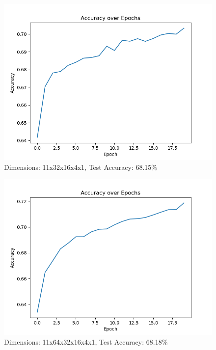 \documentclass[12pt, notitlepage]{article}
\begin{document}
\begin{figure}[H]
	\centering
	\includegraphics[scale=0.6]{neuralnet1.png}
	\caption{Dimensions: 11x32x16x4x1, Test Accuracy: 68.15\%}
\end{figure}
\begin{figure}[H]
	\centering
	\includegraphics[scale=0.6]{neuralnet2.png}
	\caption{Dimensions: 11x64x32x16x4x1, Test Accuracy: 68.18\%}
\end{figure}
\end{document}

